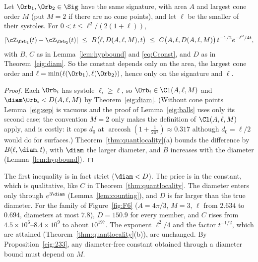 
\begin{theorem}\label{eig:loc}
Let $\Orb_1,\Orb_2\in\Sig$ have the same signature, with area $A$ and largest cone order $M$ (put $M=2$ if there are no cone points), and let $\ell$ be the smaller of their systoles. For $0<t\le\ell^2/(2(1+\ell))$,
\[
  |\cZ_{\Orb_1}(t)-\cZ_{\Orb_2}(t)|\ \le\ B\big(\ell,D(A,\ell,M),t\big)\ \le\ C\big(A,\ell,D(A,\ell,M)\big)\,t^{-1/2}e^{-\ell^2/4t},
\]
with $B$, $C$ as in Lemma~\ref{lem:hypbound} and \eqref{eq:Cconst}, and $D$ as in Theorem~\ref{eig:diam}. So the constant depends only on the area, the largest cone order and $\ell=\min(\ell(\Orb_1),\ell(\Orb_2))$, hence only on the signature and $\ell$.
\end{theorem}

\begin{proof}
Each $\Orb_i$ has systole $\ell_i\ge\ell$, so $\Orb_i\in\Cl(A,\ell,M)$ and $\diam\Orb_i<D(A,\ell,M)$ by Theorem~\ref{eig:diam}. (Without cone points Lemma~\ref{eig:sep} is vacuous and the proof of Lemma~\ref{eig:balls} uses only its second case; the convention $M=2$ only makes the definition of $\Cl(A,\ell,M)$ apply, and is costly: it caps $d_0$ at $\operatorname{arccosh}(1+\frac1{2\pi^2})\approx0.317$ although $d_0=\ell/2$ would do for surfaces.) Theorem~\ref{thm:quantlocality}(a) bounds the difference by $B(\ell,\diam,t)$, with $\diam$ the larger diameter, and $B$ increases with the diameter (Lemma~\ref{lem:hypbound}).
\end{proof}

The first inequality is in fact strict ($\diam<D$). The price is in the constant, which is qualitative, like $C$ in Theorem~\ref{thm:quantlocality}. The diameter enters only through $e^{3\diam}$ (Lemma~\ref{lem:counting}), and $D$ is far larger than the true diameter. For the family of Figure~\ref{fig:F6} ($A=4\pi/3$, $M=3$, $\ell$ from $2.634$ to $0.694$, diameters at most $7.8$), $D=150.9$ for every member, and $C$ rises from $4.5\times10^6$--$8.4\times10^9$ to about $10^{197}$. The exponent $\ell^2/4$ and the factor $t^{-1/2}$, which are attained (Theorem~\ref{thm:quantlocality}(b)), are unchanged. By Proposition~\ref{eig:233}, any diameter-free constant obtained through a diameter bound must depend on $M$.
